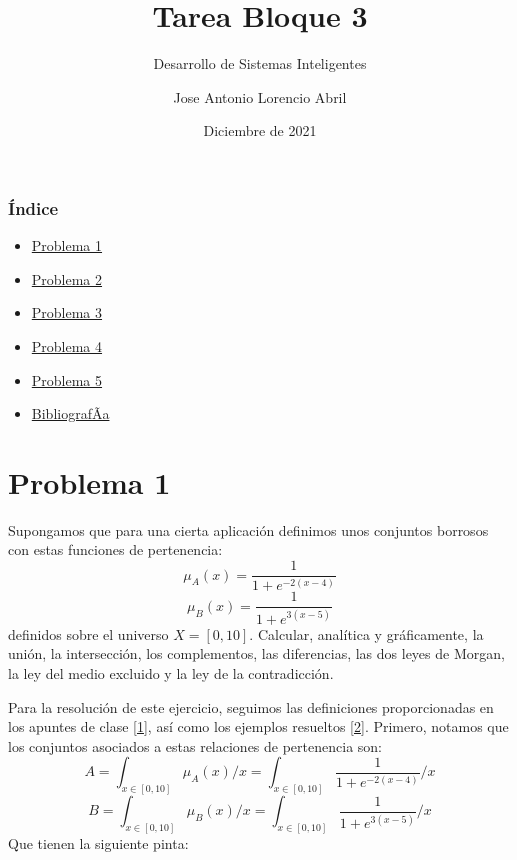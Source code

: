 \documentclass[
]{article}
\title{Tarea Bloque 3}
\subtitle{Desarrollo de Sistemas Inteligentes}
\author{Jose Antonio Lorencio Abril}
\date{Diciembre de 2021}
\providecommand{\tightlist}{%
  \setlength{\itemsep}{0pt}\setlength{\parskip}{0pt}}
\begin{document}
\maketitle

\newpage

\hypertarget{uxedndice}{%
\subsubsection{Índice}\label{uxedndice}}

\begin{itemize}
\tightlist
\item
  \protect\hyperlink{problema-1}{Problema 1}
\item
  \protect\hyperlink{problema-2}{Problema 2}
\item
  \protect\hyperlink{problema-3}{Problema 3}
\item
  \protect\hyperlink{problema-4}{Problema 4}
\item
  \protect\hyperlink{problema-5}{Problema 5}
\item
  \protect\hyperlink{bibliografuxe3uxada}{BibliografÃ­a}
\end{itemize}

\newpage

\hypertarget{problema-1}{%
\section{Problema 1}\label{problema-1}}

 Supongamos que para una cierta aplicación definimos
unos conjuntos borrosos con estas funciones de pertenencia:
\[\mu_{A}\left(x\right)=\frac{1}{1+e^{-2\left(x-4\right)}}\]
\[\mu_{B}\left(x\right)=\frac{1}{1+e^{3\left(x-5\right)}}\] definidos
sobre el universo \(X=\left[0,10\right]\). Calcular, analítica y
gráficamente, la unión, la intersección, los complementos, las
diferencias, las dos leyes de Morgan, la ley del medio excluido y la ley
de la contradicción.

Para la resolución de este ejercicio, seguimos las definiciones
proporcionadas en los apuntes de clase
{[}\protect\hyperlink{ref-PalmaConjuntosBorrosos}{1}{]}, así como los
ejemplos resueltos
{[}\protect\hyperlink{ref-BotiaConjuntosBorrosos}{2}{]}. Primero,
notamos que los conjuntos asociados a estas relaciones de pertenencia
son:
\[A=\int_{x\in\left[0,10\right]}\mu_{A}\left(x\right)/x=\int_{x\in\left[0,10\right]}\frac{1}{1+e^{-2\left(x-4\right)}}/x\]
\[B=\int_{x\in\left[0,10\right]}\mu_{B}\left(x\right)/x=\int_{x\in\left[0,10\right]}\frac{1}{1+e^{3\left(x-5\right)}}/x\]
Que tienen la siguiente pinta:
\end{document}

